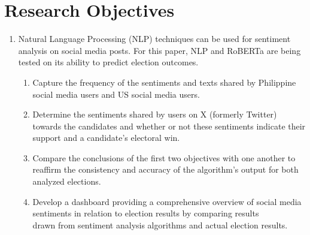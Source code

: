 \section{Research Objectives}
\begin{enumerate}
    \item Natural Language Processing (NLP) techniques can be used for sentiment analysis on social media posts. For this paper, NLP and RoBERTa are being tested on its ability to predict election outcomes.
    \begin{enumerate}
        \item Capture the frequency of the sentiments and texts shared by Philippine social media users and US social media users.
        \item Determine the sentiments shared by users on X (formerly Twitter) towards the candidates and whether or not these sentiments indicate their support and a candidate's electoral win.
        \item Compare the conclusions of the first two objectives with one another to reaffirm the consistency and accuracy of the algorithm’s output for both analyzed elections.
        \item Develop a dashboard providing a comprehensive overview of social media sentiments in relation to election results by comparing results\\drawn from sentiment analysis algorithms and actual election results.
    \end{enumerate}
\end{enumerate}
